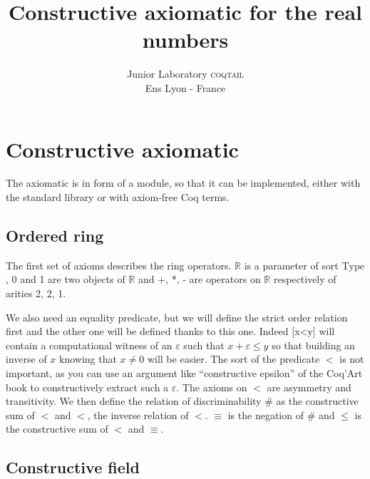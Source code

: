 \documentclass[a4paper,11pt]{article}
\newcommand{\R}{\mathbb{R}}
\newcommand{\Type}{\mbox{Type}}
\newcommand{\coqtail}{\textsc{coqtail}}
\theoremstyle{definition}
\theoremstyle{remark}
\begin{document}
\title{Constructive axiomatic for the real numbers}
\author{Junior Laboratory \coqtail{}\\
Ens Lyon - France\\}

\maketitle 
{}

\section{Constructive axiomatic}

The axiomatic is in form of a module, so that it can be implemented, either with the standard library or with axiom-free Coq terms.

\subsection{Ordered ring}

The first set of axioms describes the ring operators. $\R$ is a parameter of sort $\Type$, 0 and 1 are two objects of $\R$ and +, *, - are operators on $\R$ respectively of arities 2, 2, 1.

We also need an equality predicate, but we will define the strict order relation first and the other one will be defined thanks to this one. Indeed [x<y] will contain a computational witness of an $\varepsilon$ such that $x+\varepsilon≤y$ so that building an inverse of $x$ knowing that $x\neq 0$ will be easier. The sort of the predicate $<$ is not important, as you can use an argument like ``constructive epsilon'' of the Coq’Art book to constructively extract such a $\varepsilon$. The axioms on $<$ are asymmetry and transitivity. We then define the relation of discriminability $\#$ as the constructive sum of $<$ and $<$, the inverse relation of $<$. $≡$ is the negation of $\#$ and $≤$ is the constructive sum of $<$ and $≡$.


\subsection{Constructive field}
\end{document}

